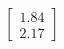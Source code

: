\documentclass[preview]{standalone}
\begin{document}
\begin{align*}
\begin{bmatrix} 1.84 \\ 2.17 \end{bmatrix}
\end{align*}
\end{document}

